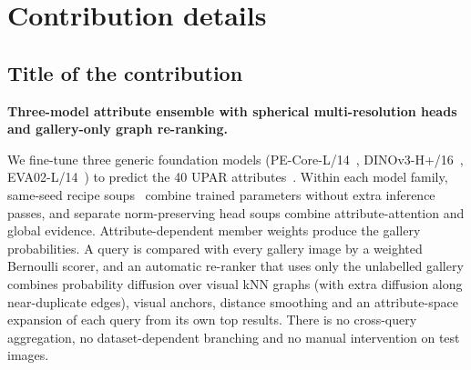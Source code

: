 \documentclass[a4paper, 10pt, conference]{ieeeconf}
\begin{document}
%
\section{Contribution details}
%

\subsection{Title of the contribution}
\textbf{Three-model attribute ensemble with spherical multi-resolution heads and gallery-only graph re-ranking.}

We fine-tune three generic foundation models (PE-Core-L/14~\cite{Bolya:2025}, DINOv3-H+/16~\cite{Simeoni:2025}, EVA02-L/14~\cite{Fang:2024}) to predict the 40 UPAR attributes~\cite{Specker_2023_WACV}. Within each model family, same-seed recipe soups~\cite{Wortsman:2022} combine trained parameters without extra inference passes, and separate norm-preserving head soups combine attribute-attention and global evidence. Attribute-dependent member weights produce the gallery probabilities. A query is compared with every gallery image by a weighted Bernoulli scorer, and an automatic re-ranker that uses only the unlabelled gallery combines probability diffusion over visual kNN graphs (with extra diffusion along near-duplicate edges), visual anchors, distance smoothing and an attribute-space expansion of each query from its own top results. There is no cross-query aggregation, no dataset-dependent branching and no manual intervention on test images.
\end{document}
